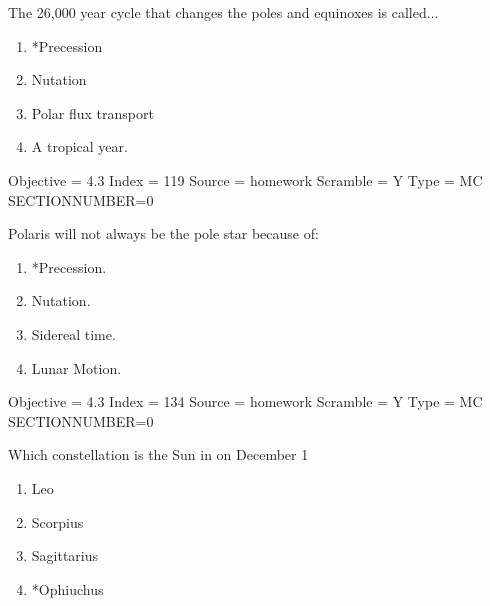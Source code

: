 \documentclass[11pt]{article}
\begin{document}
\begin{enumerate}
\begin{minipage}{\textwidth}
\begin{minipage}{\textwidth}
\item The 26,000 year cycle that changes the poles and equinoxes is called...
\begin{multicols}{2}
\begin{enumerate} 
\setlength{\itemsep}{1pt} 
\setlength{\parskip}{0pt} 
\setlength{\parsep}{0pt}
\setlength{\multicolsep}{1pt} 
\item *Precession
\item Nutation
\item Polar flux transport
\item A tropical year.
\end{enumerate} 
\vfill 
\end{multicols}

Objective = 4.3
Index = 119
Source = homework
Scramble = Y
Type = MC
SECTIONNUMBER=0
\end{minipage}
\end{minipage}
\vskip 0.20in

\begin{minipage}{\textwidth}
\begin{minipage}{\textwidth}
\item Polaris will not always be the pole star because of:
\begin{multicols}{3}
\begin{enumerate} 
\setlength{\itemsep}{1pt} 
\setlength{\parskip}{0pt} 
\setlength{\parsep}{0pt}
\setlength{\multicolsep}{1pt} 
\item *Precession.
\item Nutation.
\item Sidereal time.
\item Lunar Motion.
\end{enumerate} 
\vfill 
\end{multicols}

Objective = 4.3
Index = 134
Source = homework
Scramble = Y
Type = MC
SECTIONNUMBER=0
\end{minipage}
\end{minipage}
\vskip 0.20in

\begin{minipage}{\textwidth}
\begin{minipage}{\textwidth}
\item Which constellation is the Sun in on December 1
\begin{multicols}{3}
\begin{enumerate} 
\setlength{\itemsep}{1pt} 
\setlength{\parskip}{0pt} 
\setlength{\parsep}{0pt}
\setlength{\multicolsep}{1pt} 
\item Leo
\item Scorpius
\item Sagittarius
\item *Ophiuchus
\end{enumerate} 
\vfill 
\end{multicols}


\end{minipage}
\end{minipage}
\end{enumerate}
\end{document}

